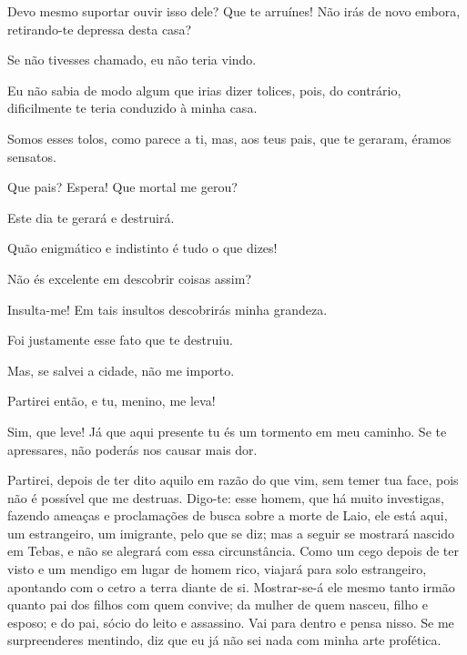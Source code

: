    Devo mesmo suportar  ouvir isso dele? Que te arruínes! Não irás de
novo embora, retirando-te depressa desta casa?

   Se não tivesses chamado, eu não teria vindo.

   Eu não sabia de modo algum que irias dizer tolices, pois, do contrário,
dificilmente te teria conduzido à minha casa.

   Somos esses tolos, como parece a ti, mas, aos teus pais, que te geraram,
éramos sensatos.

   Que pais? Espera! Que mortal me gerou?

   Este dia te gerará e destruirá.

   Quão enigmático e indistinto é tudo o que dizes!

   Não és excelente  em descobrir coisas assim?

   Insulta-me! Em tais insultos descobrirás minha grandeza.

   Foi justamente esse fato que te destruiu.

   Mas, se salvei a cidade, não me importo.

   Partirei então, e tu, menino, me leva!

   Sim, que leve! Já que aqui presente tu és um tormento em meu caminho. Se
te apressares, não poderás nos causar mais dor.

   Partirei, depois de ter dito aquilo em razão do que vim, sem temer tua
face, pois não é possível que me destruas. Digo-te: esse homem,
que há muito investigas, fazendo ameaças e proclamações de busca sobre a
morte de Laio, ele está aqui, um estrangeiro, um imigrante, pelo que se
diz; mas a seguir se mostrará nascido em Tebas, e não se alegrará com
essa circunstância. Como um cego depois de ter visto e um mendigo em
lugar de homem rico, viajará para solo estrangeiro, apontando com o
cetro a terra diante de si. Mostrar-se-á ele mesmo tanto irmão quanto
pai dos filhos com quem convive; da mulher de quem nasceu, filho e
esposo; e do pai, sócio do leito e assassino. Vai para dentro e pensa
nisso. Se me surpreenderes mentindo, diz que eu já não sei nada com
minha arte profética.


